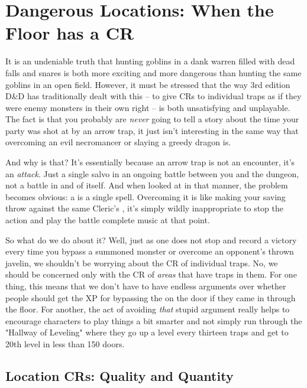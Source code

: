\section{Dangerous Locations: When the Floor has a CR}

It is an undeniable truth that hunting goblins in a dank warren filled with dead falls and snares is both more exciting and more dangerous than hunting the same goblins in an open field. However, it must be stressed that the way 3rd edition D\&D has traditionally dealt with this -- to give CRs to individual traps as if they were enemy monsters in their own right -- is both unsatisfying and unplayable. The fact is that you probably are \textit{never} going to tell a story about the time your party was shot at by an arrow trap, it just isn't interesting in the same way that overcoming an evil necromancer or slaying a greedy dragon is.

And why is that? It's essentially because an arrow trap is not an encounter, it's an \textit{attack}. Just a single salvo in an ongoing battle between you and the dungeon, not a battle in and of itself. And when looked at in that manner, the problem becomes obvious: a  is a single spell. Overcoming it is like making your saving throw against the same Cleric's , it's simply wildly inappropriate to stop the action and play the battle complete music at that point.

So what do we do about it? Well, just as one does not stop and record a victory every time you bypass a summoned monster or overcome an opponent's thrown javelin, we shouldn't be worrying about the CR of individual traps. No, we should be concerned only with the CR of \textit{areas} that have traps in them. For one thing, this means that we don't have to have endless arguments over whether people should get the XP for bypassing the  on the door if they came in through the floor. For another, the act of avoiding \textit{that} stupid argument really helps to encourage characters to play things a bit smarter and not simply run through the "Hallway of Leveling" where they go up a level every thirteen traps and get to 20th level in less than 150 doors.

\subsection{Location CRs: Quality and Quantity}
\vspace*{-8pt}

